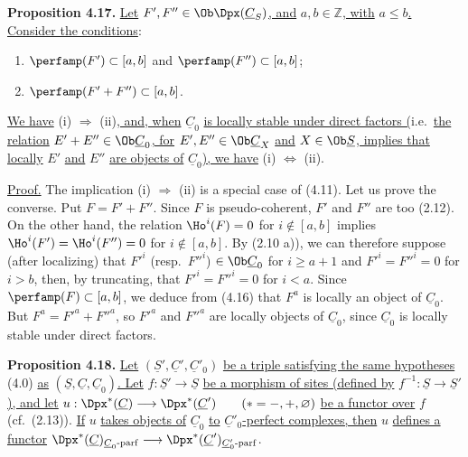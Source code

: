 \textbf{Proposition 4.17.} \uline{Let} \(F',F''\in\Ob\Dpx(\underline{C}_S)\)\uline{, and} \(a,b\in\mathbb Z\)\uline{, with} \(a\leq b\)\uline{. Consider the conditions}:
\begin{enumerate}[label=(\roman*)]
\item \(\perfamp(F')\subset[a,b]\) and \(\perfamp(F'')\subset[a,b]\);
\item \(\perfamp(F'+F'')\subset[a,b]\).
\end{enumerate}
\uline{We have} (i) \(\Rightarrow\) (ii)\uline{, and, when} \(\underline{C}_0\) \uline{is locally stable under direct factors (}i.e.\ \uline{the relation} \(E'+E''\in\Ob\underline{C}_0\)\uline{, for} \(E',E''\in\Ob\underline{C}_X\) \uline{and} \(X\in\Ob \underline{S}\)\uline{, implies that locally} \(E'\) \uline{and} \(E''\) \uline{are objects of} \(\underline{C}_0\)\uline{), we have} (i) \(\Leftrightarrow\) (ii).

\uline{Proof.} The implication (i) \(\Rightarrow\) (ii) is a special case of (4.11). Let us prove the converse. Put \(F=F'+F''\). Since \(F\) is pseudo-coherent, \(F'\) and \(F''\) are too (2.12). On the other hand, the relation \(\Ho^i(F)=0\) for \(i\notin[a,b]\) implies \(\Ho^i(F')=\Ho^i(F'')=0\) for \(i\notin[a,b]\). By (2.10 a)), we can therefore suppose (after localizing) that \(F'^i\) (resp.\ \(F''^i\)) \(\in\Ob\underline{C}_0\) for \(i\geq a+1\) and \(F'^i=F''^i=0\) for \(i>b\), then, by truncating, that
%
\(F'^i=F''^i=0\) for \(i<a\). Since \(\perfamp(F)\subset[a,b]\), we deduce from (4.16) that \(F^a\) is locally an object of \(\underline{C}_0\). But \(F^a=F'^a+F''^a\), so \(F'^a\) and \(F''^a\) are locally objects of \(\underline{C}_0\), since \(\underline{C}_0\) is locally stable under direct factors.

\textbf{Proposition 4.18.} \uline{Let} \((\underline{S}',\underline{C}',\underline{C}'_0)\) \uline{be a triple satisfying the same hypotheses} (4.0) \uline{as} \((\underline{S},\underline{C},\underline{C}_0)\)\uline{. Let} \(f:\underline{S}'\to \underline{S}\) \uline{be a morphism of sites (defined by} \(f^{-1}:\underline{S}\to \underline{S}'\)\uline{), and let}
\(u:\Dpx^*(\underline{C})\longrightarrow \Dpx^*(\underline{C}')\qquad (*=-,+,\varnothing)\)
\uline{be a functor over} \(f\) (cf.\ (2.13)). \uline{If} \(u\) \uline{takes objects of} \(\underline{C}_0\) \uline{to} \(\underline{C}'_0\)\uline{-perfect complexes, then} \(u\) \uline{defines a functor}
\(\Dpx^*(\underline{C})_{\underline{C}_0\text{-}\mathrm{parf}}\longrightarrow\Dpx^*(\underline{C}')_{\underline{C}'_0\text{-}\mathrm{parf}}\).

